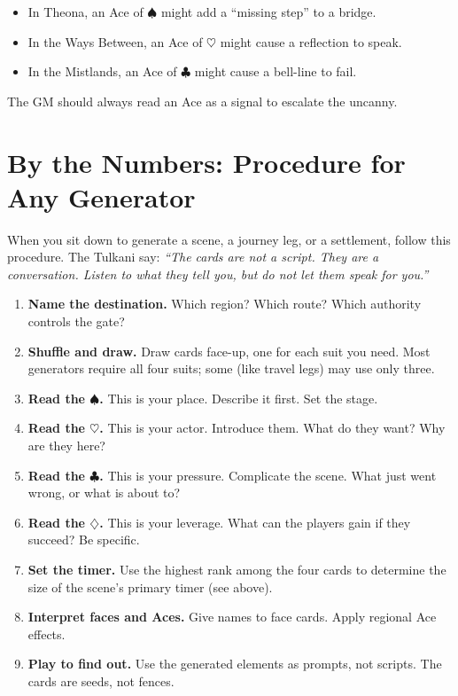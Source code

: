 \documentclass[11pt,letterpaper,twoside]{book}
\begin{document}
\begin{itemize}
    \item In Theona, an Ace of $\spadesuit$ might add a ``missing step'' to a bridge.
    \item In the Ways Between, an Ace of $\heartsuit$ might cause a reflection to speak.
    \item In the Mistlands, an Ace of $\clubsuit$ might cause a bell-line to fail.
\end{itemize}

The GM should always read an Ace as a signal to escalate the uncanny.

\section*{By the Numbers: Procedure for Any Generator}

When you sit down to generate a scene, a journey leg, or a settlement, follow this procedure. The Tulkani say: \textit{``The cards are not a script. They are a conversation. Listen to what they tell you, but do not let them speak for you.''}

\begin{enumerate}
    \item \textbf{Name the destination.} Which region? Which route? Which authority controls the gate?
    \item \textbf{Shuffle and draw.} Draw cards face-up, one for each suit you need. Most generators require all four suits; some (like travel legs) may use only three.
    \item \textbf{Read the $\spadesuit$.} This is your place. Describe it first. Set the stage.
    \item \textbf{Read the $\heartsuit$.} This is your actor. Introduce them. What do they want? Why are they here?
    \item \textbf{Read the $\clubsuit$.} This is your pressure. Complicate the scene. What just went wrong, or what is about to?
    \item \textbf{Read the $\diamondsuit$.} This is your leverage. What can the players gain if they succeed? Be specific.
    \item \textbf{Set the timer.} Use the highest rank among the four cards to determine the size of the scene's primary timer (see above).
    \item \textbf{Interpret faces and Aces.} Give names to face cards. Apply regional Ace effects.
    \item \textbf{Play to find out.} Use the generated elements as prompts, not scripts. The cards are seeds, not fences.
\end{enumerate}
\end{document}
